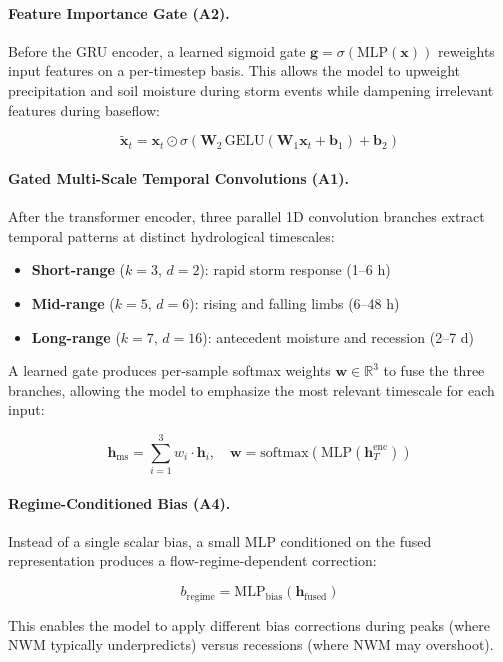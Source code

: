 \documentclass[draft]{agujournal2019}
\begin{document}
\paragraph{Feature Importance Gate (A2).} Before the GRU encoder, a learned sigmoid gate $\mathbf{g} = \sigma(\text{MLP}(\mathbf{x}))$ reweights input features on a per-timestep basis. This allows the model to upweight precipitation and soil moisture during storm events while dampening irrelevant features during baseflow:
\begin{linenomath*}
\begin{equation}
    \tilde{\mathbf{x}}_t = \mathbf{x}_t \odot \sigma\!\left(\mathbf{W}_2 \, \text{GELU}(\mathbf{W}_1 \mathbf{x}_t + \mathbf{b}_1) + \mathbf{b}_2\right)
\end{equation}
\end{linenomath*}

\paragraph{Gated Multi-Scale Temporal Convolutions (A1).} After the transformer encoder, three parallel 1D convolution branches extract temporal patterns at distinct hydrological timescales:
\begin{itemize}
    \item \textbf{Short-range} ($k{=}3$, $d{=}2$): rapid storm response (1--6 h)
    \item \textbf{Mid-range} ($k{=}5$, $d{=}6$): rising and falling limbs (6--48 h)
    \item \textbf{Long-range} ($k{=}7$, $d{=}16$): antecedent moisture and recession (2--7 d)
\end{itemize}
A learned gate produces per-sample softmax weights $\mathbf{w} \in \mathbb{R}^3$ to fuse the three branches, allowing the model to emphasize the most relevant timescale for each input:
\begin{linenomath*}
\begin{equation}
    \mathbf{h}_{\text{ms}} = \sum_{i=1}^{3} w_i \cdot \mathbf{h}_i, \quad \mathbf{w} = \text{softmax}(\text{MLP}(\mathbf{h}_T^{\text{enc}}))
\end{equation}
\end{linenomath*}

\paragraph{Regime-Conditioned Bias (A4).} Instead of a single scalar bias, a small MLP conditioned on the fused representation produces a flow-regime-dependent correction:
\begin{linenomath*}
\begin{equation}
    b_{\text{regime}} = \text{MLP}_{\text{bias}}(\mathbf{h}_{\text{fused}})
\end{equation}
\end{linenomath*}
This enables the model to apply different bias corrections during peaks (where NWM typically underpredicts) versus recessions (where NWM may overshoot).
\end{document}
